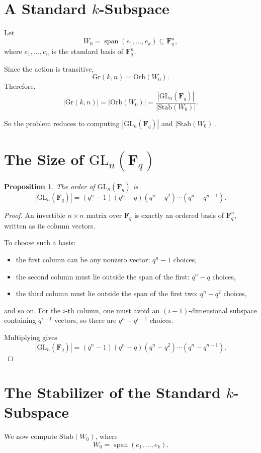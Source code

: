 \documentclass[11pt]{article}
\newtheorem{proposition}[theorem]{Proposition}
\theoremstyle{definition}
\theoremstyle{remark}
\newcommand{\F}{\mathbf{F}}
\newcommand{\GL}{\mathrm{GL}}
\newcommand{\Gr}{\mathrm{Gr}}
\newcommand{\Stab}{\mathrm{Stab}}
\newcommand{\Orb}{\mathrm{Orb}}
\newcommand{\Span}{\operatorname{span}}
\begin{document}
	\section{A Standard \(k\)-Subspace}
	
	Let
	\[
	W_0 = \Span(e_1,\dots,e_k)\subseteq \F_q^n,
	\]
	where \(e_1,\dots,e_n\) is the standard basis of \(\F_q^n\).
	
	Since the action is transitive,
	\[
	\Gr(k,n)=\Orb(W_0).
	\]
	Therefore,
	\[
	|\Gr(k,n)|=|\Orb(W_0)|=\frac{|\GL_n(\F_q)|}{|\Stab(W_0)|}.
	\]
	
	So the problem reduces to computing \(|\GL_n(\F_q)|\) and \(|\Stab(W_0)|\).
	
	\section{The Size of \(\GL_n(\F_q)\)}
	
	\begin{proposition}
		The order of \(\GL_n(\F_q)\) is
		\[
		|\GL_n(\F_q)|
		=
		(q^n-1)(q^n-q)(q^n-q^2)\cdots(q^n-q^{n-1}).
		\]
	\end{proposition}
	
	\begin{proof}
		An invertible \(n\times n\) matrix over \(\F_q\) is exactly an ordered basis of \(\F_q^n\), written as its column vectors.
		
		To choose such a basis:
		\begin{itemize}
			\item the first column can be any nonzero vector: \(q^n-1\) choices,
			\item the second column must lie outside the span of the first: \(q^n-q\) choices,
			\item the third column must lie outside the span of the first two: \(q^n-q^2\) choices,
		\end{itemize}
		and so on. For the \(i\)-th column, one must avoid an \((i-1)\)-dimensional subspace containing \(q^{i-1}\) vectors, so there are \(q^n-q^{i-1}\) choices.
		
		Multiplying gives
		\[
		|\GL_n(\F_q)|
		=
		(q^n-1)(q^n-q)(q^n-q^2)\cdots(q^n-q^{n-1}).
		\]
	\end{proof}
	
	\section{The Stabilizer of the Standard \(k\)-Subspace}
	
	We now compute \(\Stab(W_0)\), where
	\[
	W_0=\Span(e_1,\dots,e_k).
	\]
	
\end{document}
